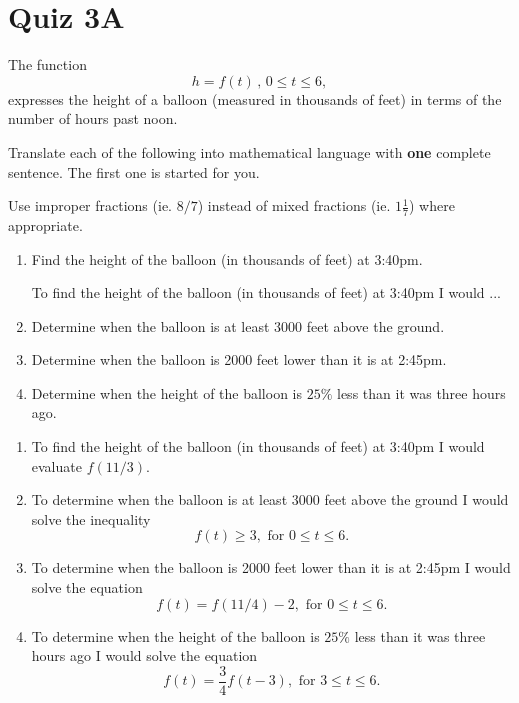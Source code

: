 \documentclass{ximera}
\begin{document}
\section{Quiz 3A}
\begin{question} \label{Qw2xzv3}
 The function 
\[
    h = f(t) \, , \, 0\leq t \leq 6 ,
\]
expresses the height of a balloon (measured in thousands of feet) in terms of the number of hours past noon.

Translate each of the following into mathematical language with {\bf one} complete sentence. The first one is started for you.

Use improper fractions (ie. $8/7$) instead of mixed fractions (ie. $1 \frac{1}{7}$) where appropriate.
 
\begin{enumerate}
\item Find the height of the balloon (in thousands of feet) at 3:40pm.

To find the height of the balloon (in thousands of feet) at 3:40pm I would ...


\item Determine when the balloon is at least 3000 feet above the ground.

\item Determine when the balloon is 2000 feet lower than it is at 2:45pm.

\item Determine when the height of the balloon is $25\%$ less than it was three hours ago.

\end{enumerate}

\begin{explanation}
\begin{enumerate}
\item To find the height of the balloon (in thousands of feet) at 3:40pm I would evaluate $f(11/3)$.

\item To determine when the balloon is at least 3000 feet above the ground I would solve the inequality
\[
     f(t) \geq 3 ,  \text{ for } 0\leq t \leq 6.
\]

\item To determine when the balloon is 2000 feet lower than it is at 2:45pm I would solve the equation
\[
     f(t) = f(11/4) - 2 ,  \text{ for } 0\leq t \leq 6.
\]

\item To determine when the height of the balloon is $25\%$ less than it was three hours ago I would solve the equation
\[
         f(t) = \frac{3}{4} f(t-3) ,  \text{ for } 3\leq t \leq 6 .
\]
\end{enumerate}
\end{explanation}

\end{question}
\end{document}
